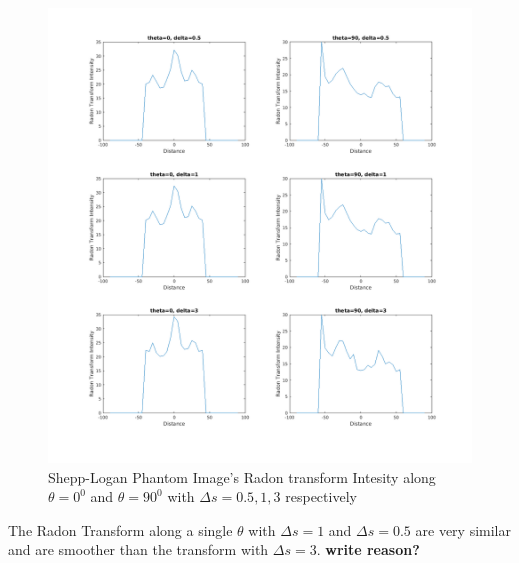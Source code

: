 \documentclass[11pt]{article}
\begin{document}
\begin{figure}[h]
\centering
\includegraphics[scale=0.4]{c2}
\caption{Shepp-Logan Phantom Image's Radon transform Intesity along $\theta=0^{0} $ and $\theta=90^{0} $ with $\Delta s = 0.5,1,3$ respectively}
\end{figure}

The Radon Transform along a single $\theta$ with $\Delta s=1$ and $\Delta s=0.5$ are very similar and are smoother than the transform with $\Delta s=3$. 
\textbf{write reason?}
\end{document}
